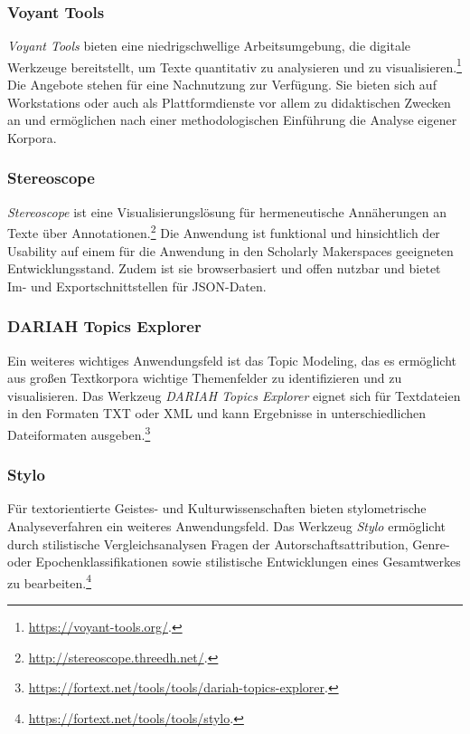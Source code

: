\documentclass[a4paper,
fontsize=11pt,
oneside,
numbers=noperiodatend,
parskip=half-,
bibliography=totoc,
final
]{scrartcl}
\begin{document}
\hypertarget{voyant-tools}{%
\subsubsection{Voyant Tools}\label{voyant-tools}}

\emph{Voyant Tools} bieten eine niedrigschwellige Arbeitsumgebung, die
digitale Werkzeuge bereitstellt, um Texte quantitativ zu analysieren und
zu visualisieren.\footnote{\url{https://voyant-tools.org/}.} Die
Angebote stehen für eine Nachnutzung zur Verfügung. Sie bieten sich auf
Workstations oder auch als Plattformdienste vor allem zu didaktischen
Zwecken an und ermöglichen nach einer methodologischen Einführung die
Analyse eigener Korpora.

\hypertarget{stereoscope}{%
\subsubsection{Stereoscope}\label{stereoscope}}

\emph{Stereoscope} ist eine Visualisierungslösung für hermeneutische
Annäherungen an Texte über Annotationen.\footnote{\url{http://stereoscope.threedh.net/}.}
Die Anwendung ist funktional und hinsichtlich der Usability auf einem
für die Anwendung in den Scholarly Makerspaces geeigneten
Entwicklungsstand. Zudem ist sie browserbasiert und offen nutzbar und
bietet Im- und Exportschnittstellen für JSON-Daten.

\hypertarget{dariah-topics-explorer}{%
\subsubsection{DARIAH Topics Explorer}\label{dariah-topics-explorer}}

Ein weiteres wichtiges Anwendungsfeld ist das Topic Modeling, das es
ermöglicht aus großen Textkorpora wichtige Themenfelder zu
identifizieren und zu visualisieren. Das Werkzeug \emph{DA\-RIAH Topics
Explorer} eignet sich für Textdateien in den Formaten TXT oder XML und
kann Ergebnisse in unterschiedlichen Dateiformaten ausgeben.\footnote{\url{https://fortext.net/tools/tools/dariah-topics-explorer}.}

\hypertarget{stylo}{%
\subsubsection{Stylo}\label{stylo}}

Für textorientierte Geistes- und Kulturwissenschaften bieten
stylometrische Analyseverfahren ein weiteres Anwendungsfeld. Das
Werkzeug \emph{Stylo} ermöglicht durch stilistische Vergleichsanalysen
Fragen der Autorschaftsattribution, Genre- oder Epochenklassifikationen
sowie stilistische Entwicklungen eines Gesamtwerkes zu
bearbeiten.\footnote{\url{https://fortext.net/tools/tools/stylo}.}
\end{document}
